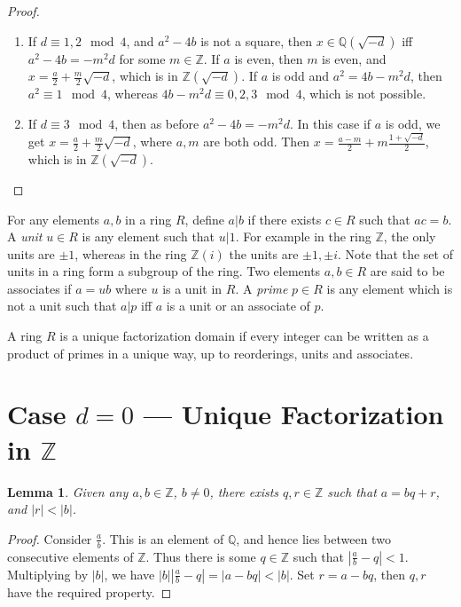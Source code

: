 \documentclass[12pt]{article}
\newcommand{\ints}{{\mathbb{Z}}}
\newcommand{\qf}{{\mathbb{Q}}}
\newtheorem{lemma}[thm]{Lemma}
\begin{document}
\begin{proof}
\begin{itemize}
\begin{enumerate}
\item If $d \equiv 1, 2 \mod 4$, and $a^2 - 4b$ is not a square, then $x \in \qf(\sqrt{-d})$ iff $a^2 - 4b = -m^2d$ for some $m \in \ints$.  If $a$ is even, then $m$ is even, and $x = \frac{a}{2} + \frac{m}{2}\sqrt{-d}$, which is in $\ints(\sqrt{-d})$. If $a$ is odd and $a^2 = 4b - m^2d$, then $a^2 \equiv 1 \mod 4$, whereas $4b - m^2d \equiv 0, 2, 3 \mod 4$, which is not possible.
\item If $d \equiv 3 \mod 4$, then as before $a^2 - 4b = -m^2d$. In this case if $a$ is odd, we get $x = \frac{a}{2} + \frac{m}{2}\sqrt{-d}$, where $a, m$ are both odd.  Then $x = \frac{a-m}{2} + m\frac{1 + \sqrt{-d}}{2}$, which is in $\ints(\sqrt{-d})$.
\end{enumerate}
\end{itemize}
\end{proof}

For any elements $a, b$ in a ring $R$, define $a | b$ if there exists $c \in R$ such that $ac = b$. 
A {\em unit} $u \in R$ is any element such that $u | 1$. For example in the ring $\ints$, the only units are $\pm 1$, whereas in the ring $\ints(i)$ the units are $\pm 1, \pm i$.  Note that the set of units in a ring form a subgroup of the ring. Two elements $a, b \in R$ are said to be associates if $a = ub$ where $u$ is a unit in $R$. A {\em prime} $p \in R$ is any element which is not a unit such that $a | p$ iff $a$ is a unit or an associate of $p$.

A ring $R$ is a unique factorization domain if every integer can be written as a product of primes in a unique way, up to reorderings, units and associates.

\section{Case $d = 0$ --- Unique Factorization in $\ints$}

\begin{lemma}\label{lem:div-ints}
Given any $a, b \in \ints$, $b \neq 0$, there exists $q, r \in \ints$ such that $a = bq + r$, and $|r| < |b|$.
\end{lemma}
\begin{proof}
Consider $\frac{a}{b}$. This is an element of $\qf$, and hence lies between two consecutive elements of $\ints$. Thus there is some $q \in \ints$ such that $| \frac{a}{b} - q| < 1$. Multiplying by $|b|$, we have $|b|  |\frac{a}{b} - q|  = |a - bq| < |b|$. Set $r = a - bq$, then $q, r$ have the required property.
\end{proof}
\end{document}

